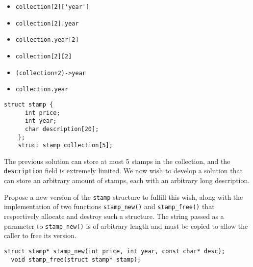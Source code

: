 \documentclass[10pt]{article}\usepackage[enonce]{exemptty}
\begin{document}
\noindent\begin{minipage}{.65\linewidth}

\noindent
\begin{minipage}{.5\linewidth}
  \begin{itemize}
  \item[\fbox{a}] \verb+collection[2]['year']+
  \item[\fbox{b}] \verb+collection[2].year+
  \item[\fbox{c}] \verb+collection.year[2]+
  \end{itemize}
\end{minipage}
\begin{minipage}{.5\linewidth}
  \begin{itemize}
  \item[\fbox{d}] \verb|collection[2][2]|
  \item[\fbox{e}] \verb|(collection+2)->year|
  \item[\fbox{f}] \verb+collection.year+
\end{itemize}
\end{minipage}

\end{minipage}
\begin{minipage}{.35\linewidth}
  \begin{Verbatim}[numbers=right, gobble=4]
    struct stamp {
      int price;
      int year;
      char description[20];
    };
    struct stamp collection[5];
  \end{Verbatim}
\end{minipage}

\medskip

The previous solution can store at most 5 stamps in the collection, and the
\texttt{description} field is extremely limited. We now wish to develop a
solution that can store an arbitrary amount of stamps, each with an arbitrary
long description.

\Question Propose a new version of the \texttt{stamp} structure to fulfill this
wish, along with the implementation of two functions \texttt{stamp\_new()} and
\texttt{stamp\_free()} that respectively allocate and destroy such a structure.
The string passed as a parameter to \texttt{stamp\_new()} is of arbitrary length
and must be copied to allow the caller to free its version.

\begin{Verbatim}[numbers=none, gobble=2]
  struct stamp* stamp_new(int price, int year, const char* desc);
  void stamp_free(struct stamp* stamp);
\end{Verbatim}
\end{document}
